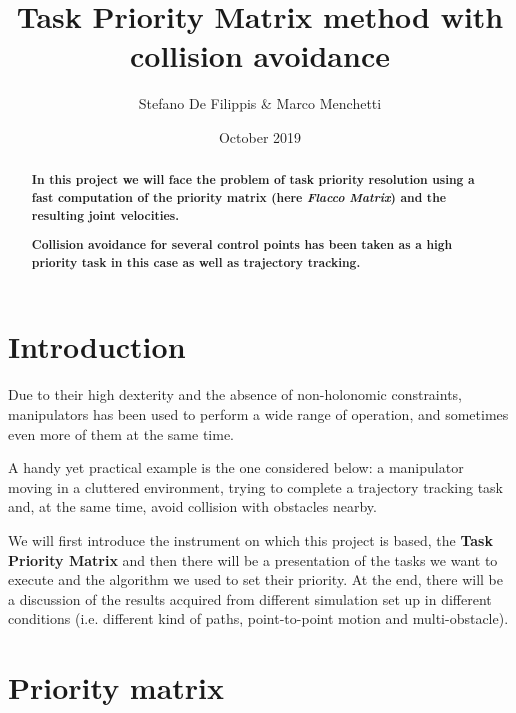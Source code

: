 \documentclass[12pt, a4paper]{article}
\begin{document}
	
	\title{Task Priority Matrix method with collision avoidance}
	\author{Stefano De Filippis \& Marco Menchetti}
	\date{October 2019}
	\maketitle
	
	\newpage
	\tableofcontents
	\newpage
	
\begin{abstract}
	\textbf{
	In this project we will face the problem of task priority resolution using a fast computation of the priority matrix (here \textit{Flacco Matrix}) and the resulting joint velocities.}

\textbf{
	Collision avoidance for several control points has been taken as a high priority task in this case as well as trajectory tracking.}
\end{abstract}
\section*{Introduction}
Due to their high dexterity and the absence of non-holonomic constraints, manipulators has been used to perform a wide range of operation, and sometimes even more of them at the same time.

A handy yet practical example is the one considered below: a manipulator moving in a cluttered environment, trying to complete a trajectory tracking task and, at the same time, avoid collision with obstacles nearby.

We will first introduce the instrument on which this project is based, the \textbf{Task Priority Matrix} and then there will be a presentation of the tasks we want to execute and the algorithm we used to set their priority. At the end, there will be a discussion of the results acquired from different simulation set up in different conditions (i.e. different kind of paths, point-to-point motion and multi-obstacle).

\section{Priority matrix}
\end{document}
